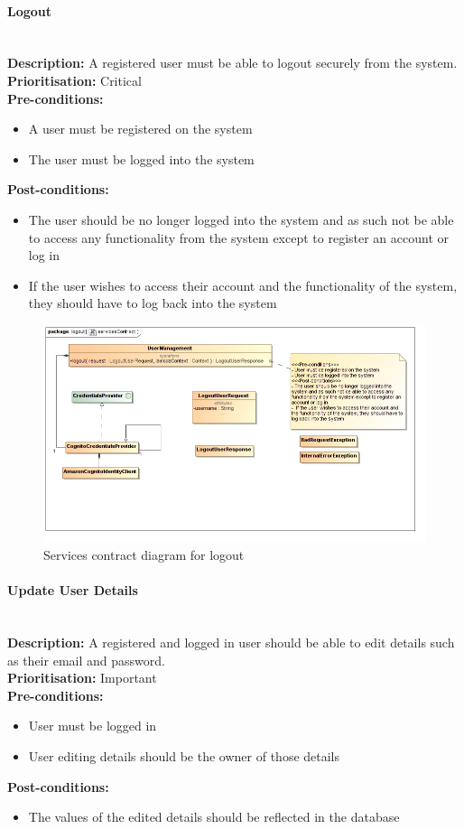 \documentclass{article}
\begin{document}
\paragraph{Logout}\mbox{}\\
\textbf{Description:} A registered user must be able to logout securely from the system.\\
\textbf{Prioritisation:} Critical\\		
\textbf{Pre-conditions:}
\begin{itemize}
	\item A user must be registered on the system
	\item The user must be logged into the system
\end{itemize}
\textbf{Post-conditions:}
\begin{itemize}
	\item The user should be no longer logged into the system and as such not be able to access any functionality from the system except to register an account or log in
	\item If the user wishes to access their account and the functionality of the system, they should have to log back into the system
\end{itemize}	

\begin{figure}[H]
	\includegraphics[width=\linewidth]{images/ServicesContracts/logout.jpg}
	\caption{Services contract diagram for logout}
\end{figure}

\paragraph{Update User Details}\mbox{}\\
\textbf{Description:} A registered and logged in user should be able to edit details such as their email and password.\\
\textbf{Prioritisation:} Important\\		
\textbf{Pre-conditions:}
\begin{itemize}
	\item User must be logged in
	\item User editing details should be the owner of those details
\end{itemize}
\textbf{Post-conditions:}
\begin{itemize}
	\item The values of the edited details should be reflected in the database
\end{itemize}	
\end{document}
